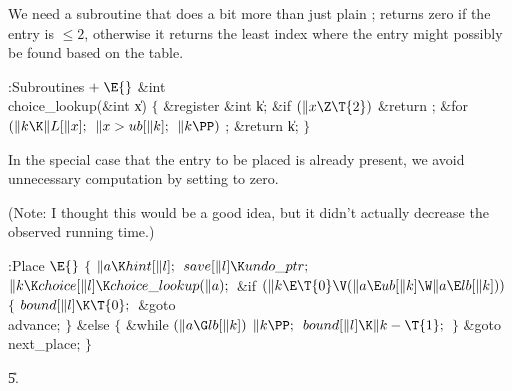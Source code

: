 We need a subroutine that does a bit more than just plain ;
 returns zero if the entry is $\le2$, otherwise it
returns the least index where the entry might possibly be found
based on the  table.

\Y\B\4:Subroutines\X${}\mathrel+\E{}$\6
\&{int} \\{choice\_lookup}(\&{int} \|x)\6
${}\{{}$\1\6
\&{register} \&{int} \|k;\7
\&{if} ${}(\|x\Z\T{2}){}$\1\5
\&{return} ;\2\6
\&{for} ${}(\|k\K\|L[\|x];{}$ ${}\|x>\\{ub}[\|k];{}$ ${}\|k\PP){}$\1\5
;\2\6
\&{return} \|k;\6
\4${}\}{}$\2\par
\fi

In the special case that the entry to be placed is already present,
we avoid unnecessary computation by setting  to zero.

(Note: I thought this would be a good idea, but it didn't actually
decrease the observed running time.)

\Y\B\4:Place \X${}\E{}$\6
${}\{{}$\1\6
${}\|a\K\\{hint}[\|l];{}$\6
${}\\{save}[\|l]\K\\{undo\_ptr};{}$\6
${}\|k\K\\{choice}[\|l]\K\\{choice\_lookup}(\|a);{}$\6
\&{if} ${}(\|k\E\T{0}\V(\|a\E\\{ub}[\|k]\W\|a\E\\{lb}[\|k])){}$\5
${}\{{}$\1\6
${}\\{bound}[\|l]\K\T{0};{}$\6
\&{goto} \\{advance};\6
\4${}\}{}$\2\6
\&{else}\5
${}\{{}$\1\6
\&{while} ${}(\|a\G\\{lb}[\|k]){}$\1\5
${}\|k\PP;{}$\2\6
${}\\{bound}[\|l]\K\|k-\T{1};{}$\6
\4${}\}{}$\2\6
\&{goto} \\{next\_place};\6
\4${}\}{}$\2\par
\U5.\fi


